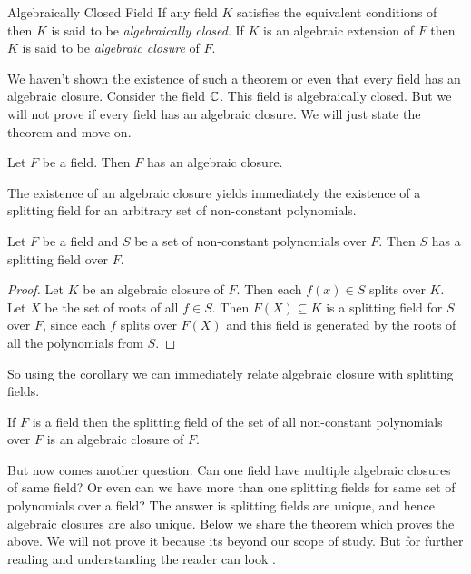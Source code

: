 \begin{Definition}{Algebraically Closed Field}{}
  If any field $K$ satisfies the equivalent conditions of  then $K$ is said to be \emph{algebraically closed}. If $K$ is an algebraic extension of $F$ then $K$ is said to be \emph{algebraic closure} of $F$. 
\end{Definition}

We haven't shown the existence of such a theorem or even that every field has an algebraic closure. Consider the field $\mathbb{C}$. This field is algebraically closed. But we will not prove if every field has an algebraic closure. We will just state the theorem and move on. 
\begin{Theorem}{}{}
  Let $F$ be a field. Then $F$ has an algebraic closure. 
\end{Theorem}

The existence of an algebraic closure yields immediately the existence of a splitting field for an arbitrary set of non-constant polynomials.
\begin{corolary}{}{}
  Let $F$ be a field and $S$ be a set of non-constant polynomials over $F$. 
  Then $S$ has a splitting field over $F$. 
\end{corolary}
\begin{proof}
  Let $K$ be an algebraic closure of $F$. Then each $f(x)\in S$ splits over $K$. Let $X$ be the set of roots of all $f\in S$. Then $F(X)\subseteq K$ is a splitting field for $S$ over $F$, since each $f$ splits over $F(X)$ and this field is generated by the roots of all the polynomials from $S$.
\end{proof}

So using the corollary we can immediately relate algebraic closure with splitting fields. 
\begin{corolary}{}{}
  If $F$ is a field then the splitting field of the set of all non-constant polynomials over $F$ is an algebraic closure of $F$. 
\end{corolary}

But now comes another question. Can one field have multiple algebraic closures of same field? Or even can we have more than one splitting fields for same set of polynomials over a field? 
The answer is splitting fields are unique, and hence algebraic closures are also unique. 
Below we share the theorem which proves the above. We will not prove it because its beyond our scope of study. But for further reading and understanding the reader can look \cite{Morandi1996}.

